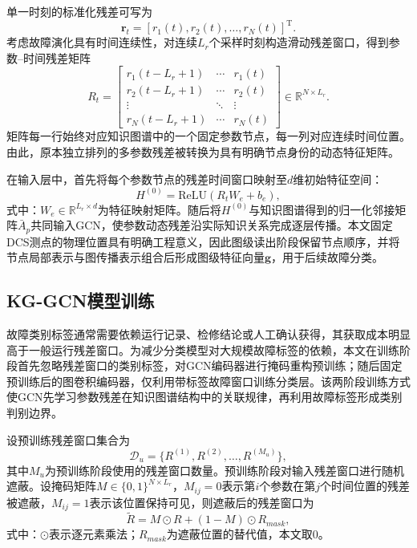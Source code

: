 单一时刻的标准化残差可写为
\begin{equation}
\mathbf r_t=[r_1(t),r_2(t),\ldots,r_N(t)]^{\mathrm T}.
\end{equation}
考虑故障演化具有时间连续性，对连续$L_r$个采样时刻构造滑动残差窗口，得到参数--时间残差矩阵
\begin{equation}
R_t=
\begin{bmatrix}
r_1(t-L_r+1)&\cdots&r_1(t)\\
r_2(t-L_r+1)&\cdots&r_2(t)\\
\vdots&\ddots&\vdots\\
r_N(t-L_r+1)&\cdots&r_N(t)
\end{bmatrix}
\in\mathbb R^{N\times L_r}.
\end{equation}
矩阵每一行始终对应知识图谱中的一个固定参数节点，每一列对应连续时间位置。由此，原本独立排列的多参数残差被转换为具有明确节点身份的动态特征矩阵。

在输入层中，首先将每个参数节点的残差时间窗口映射至$d$维初始特征空间：
\begin{equation}
H^{(0)}=\mathrm{ReLU}(R_tW_e+b_e),
\end{equation}
式中：$W_e\in\mathbb R^{L_r\times d}$为特征映射矩阵。随后将$H^{(0)}$与知识图谱得到的归一化邻接矩阵$\bar A_p$共同输入GCN，使参数动态残差沿实际知识关系完成逐层传播。本文固定DCS测点的物理位置具有明确工程意义，因此图级读出阶段保留节点顺序，并将节点局部表示与图传播表示组合后形成图级特征向量$\mathbf g$，用于后续故障分类。

\subsection{KG-GCN模型训练}
\label{subsec:kg_training_v6}

故障类别标签通常需要依赖运行记录、检修结论或人工确认获得，其获取成本明显高于一般运行残差窗口。为减少分类模型对大规模故障标签的依赖，本文在训练阶段首先忽略残差窗口的类别标签，对GCN编码器进行掩码重构预训练；随后固定预训练后的图卷积编码器，仅利用带标签故障窗口训练分类层。该两阶段训练方式使GCN先学习参数残差在知识图谱结构中的关联规律，再利用故障标签形成类别判别边界。

设预训练残差窗口集合为
\begin{equation}
\mathcal D_u=\{R^{(1)},R^{(2)},\ldots,R^{(M_u)}\},
\end{equation}
其中$M_u$为预训练阶段使用的残差窗口数量。预训练阶段对输入残差窗口进行随机遮蔽。设掩码矩阵$M\in\{0,1\}^{N\times L_r}$，$M_{ij}=0$表示第$i$个参数在第$j$个时间位置的残差被遮蔽，$M_{ij}=1$表示该位置保持可见，则遮蔽后的残差窗口为
\begin{equation}
\tilde R=M\odot R+(1-M)\odot R_{mask},
\end{equation}
式中：$\odot$表示逐元素乘法；$R_{mask}$为遮蔽位置的替代值，本文取0。

